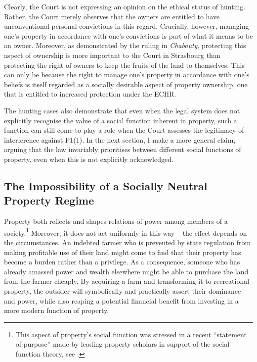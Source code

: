 Clearly, the Court is not expressing an opinion on the ethical status of hunting. Rather, the Court merely observes that the owners are entitled to have unconventional personal convictions in this regard. Crucially, however, managing one's property in accordance with one's convictions is part of what it means to be an owner. Moreover, as demonstrated by the ruling in {\it Chabauty}, protecting this aspect of ownership is more important to the Court in Strasbourg than protecting the right of owners to keep the fruits of the land to themselves. This can only be because the right to manage one's property in accordance with one's beliefs is itself regarded as a socially desirable aspect of property ownership, one that is entitled to increased protection under the ECHR. 


The hunting cases also demonstrate that even when the legal system does not explicitly recognise the value of a social function inherent in property, such a function can still come to play a role when the Court assesses the legitimacy of interference against P1(1). In the next section, I make a more general claim, arguing that the law invariably prioritises between different social functions of property, even when this is not explicitly acknowledged.

\subsection{The Impossibility of a Socially Neutral Property Regime}

Property both reflects and shapes relations of power among members of a society.\footnote{This aspect of property's social function was stressed in a recent ``statement of purpose'' made by leading property scholars in support of the social function theory, see \cite{alexander09a}.} Moreover, it does not act uniformly in this way -- the effect depends on the circumstances. An indebted farmer who is prevented by state regulation from making profitable use of their land might come to find that their property has become a burden rather than a privilege. As a consequence, someone who has already amassed power and wealth elsewhere might be able to purchase the land from the farmer cheaply. By acquiring a farm and transforming it to recreational property, the outsider will symbolically and practically assert their dominance and power, while also reaping a potential financial benefit from investing in a more modern function of property.

